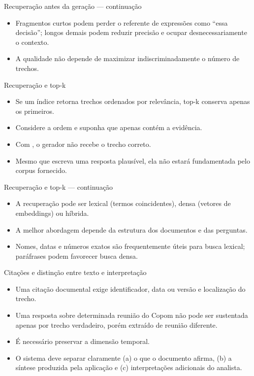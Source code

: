 \documentclass[10pt,aspectratio=169]{beamer}
\begin{document}
\begin{frame}[t]{Recuperação antes da geração — continuação}
\small
\begin{itemize}
\item Fragmentos curtos podem perder o referente de expressões como ``essa decisão''; longos demais podem reduzir precisão e ocupar desnecessariamente o contexto.
\item A qualidade não depende de maximizar indiscriminadamente o número de trechos.
\end{itemize}
\end{frame}

\begin{frame}[t]{Recuperação e top-k}
\small
\begin{itemize}
\item Se um índice retorna trechos ordenados por relevância, top-k conserva apenas os primeiros.
\item Considere a ordem e suponha que apenas contém a evidência.
\item Com , o gerador não recebe o trecho correto.
\item Mesmo que escreva uma resposta plausível, ela não estará fundamentada pelo corpus fornecido.
\end{itemize}
\end{frame}

\begin{frame}[t]{Recuperação e top-k — continuação}
\small
\begin{itemize}
\item A recuperação pode ser lexical (termos coincidentes), densa (vetores de embeddings) ou híbrida.
\item A melhor abordagem depende da estrutura dos documentos e das perguntas.
\item Nomes, datas e números exatos são frequentemente úteis para busca lexical; paráfrases podem favorecer busca densa.
\end{itemize}
\end{frame}

\begin{frame}[t]{Citações e distinção entre texto e interpretação}
\small
\begin{itemize}
\item Uma citação documental exige identificador, data ou versão e localização do trecho.
\item Uma resposta sobre determinada reunião do Copom não pode ser sustentada apenas por trecho verdadeiro, porém extraído de reunião diferente.
\item É necessário preservar a dimensão temporal.
\item O sistema deve separar claramente (a) o que o documento afirma, (b) a síntese produzida pela aplicação e (c) interpretações adicionais do analista.
\end{itemize}
\end{frame}
\end{document}
